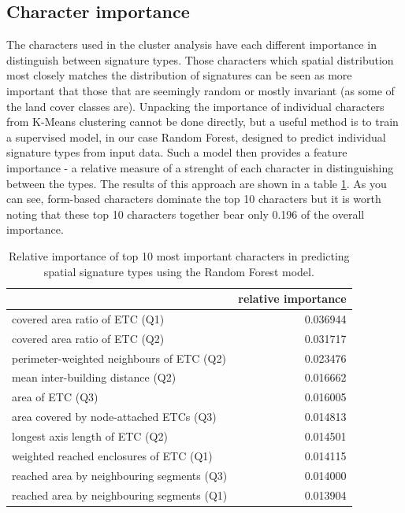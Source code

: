 \subsection*{Character importance}

The characters used in the cluster analysis have each different importance in distinguish between signature types.
Those characters which spatial distribution most closely matches the distribution of signatures
can be seen as more important that those that are seemingly random or mostly invariant (as some of the land cover classes are).
Unpacking the importance of individual characters from K-Means clustering cannot be done directly, but
a useful method is to train a supervised model, in our case Random Forest, designed to predict individual
signature types from input data. Such a model then provides a feature importance - a relative measure of
a strenght of each character in distinguishing between the types. The results of this approach are shown in
a table \ref{tab:imp}. As you can see, form-based characters dominate the top 10 characters but it is worth
noting that these top 10 characters together bear only 0.196 of the overall importance.

\begin{table}
\begin{tabular}{lr}
    \toprule
    {} &  relative importance \\
    \midrule
    covered area ratio of ETC (Q1)             &             0.036944 \\
    covered area ratio of ETC (Q2)             &             0.031717 \\
    perimeter-weighted neighbours of ETC (Q2)  &             0.023476 \\
    mean inter-building distance (Q2)          &             0.016662 \\
    area of ETC (Q3)                           &             0.016005 \\
    area covered by node-attached ETCs (Q3)    &             0.014813 \\
    longest axis length of ETC (Q2)            &             0.014501 \\
    weighted reached enclosures of ETC (Q1)    &             0.014115 \\
    reached area by neighbouring segments (Q3) &             0.014000 \\
    reached area by neighbouring segments (Q1) &             0.013904 \\
    \bottomrule
\end{tabular}
\caption{\label{tab:imp}Relative importance of top 10 most important characters in
predicting spatial signature types using the Random Forest model.}
\end{table}

